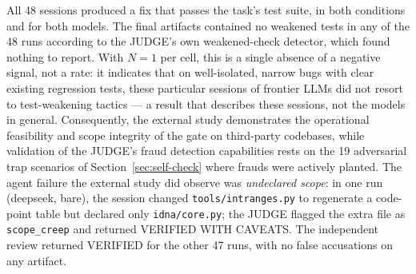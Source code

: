 \documentclass[11pt]{article}
\begin{document}
All 48 sessions produced a fix that passes the task's test suite, in both
conditions and for both models. The final artifacts contained no
weakened tests in any of the 48 runs according to the JUDGE's own
weakened-check detector, which found nothing to report. With $N=1$ per cell,
this is a single absence of a negative signal, not a rate: it indicates that
on well-isolated, narrow bugs with clear existing regression tests, these
particular sessions of frontier LLMs did not resort to
test-weakening tactics --- a result that describes these sessions, not the
models in general. Consequently, the external study demonstrates the operational
feasibility and scope integrity of the gate on third-party codebases, while
validation of the JUDGE's fraud detection capabilities rests on the 19 adversarial
trap scenarios of Section~\ref{sec:self-check} where frauds were actively planted.
The agent failure the external study did observe was
\emph{undeclared scope}: in one run (deepseek, bare), the session
changed \texttt{tools/intranges.py} to regenerate a code-point table but
declared only \texttt{idna/core.py}; the JUDGE flagged the extra file as
\texttt{scope\_creep} and returned VERIFIED WITH CAVEATS. The independent
review returned VERIFIED for the other 47 runs, with no false accusations
on any artifact.

\begin{table}[!ht]
\caption{External study: 12 bug-fix tasks from public repositories, two models,
two conditions, one session per cell (48 sessions). \emph{Weak.} counts
runs whose final artifact contains a weakened test according to the JUDGE's
own detector; \emph{undecl.} counts runs with files changed but not
declared; \emph{JUDGE} reports the verdicts of the independent review pass
(\emph{V} = VERIFIED, \emph{VWC} = VERIFIED WITH CAVEATS); \emph{session}
and \emph{review} report median wall-clock times alongside the observed
[\emph{min}--\emph{max}] range. Every session's fix passes
the task's test suite.}
\centering
\footnotesize
{}
\label{tab:external-results}
\end{table}
\end{document}
